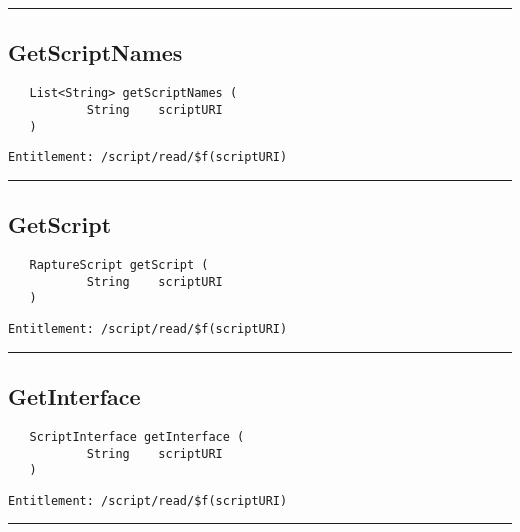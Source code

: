 \rule{12cm}{2pt}
\subsection{GetScriptNames}
\label{Api:GetScriptNames}
\begin{Verbatim}
   List<String> getScriptNames (
           String    scriptURI
   )
\end{Verbatim}
\begin{Verbatim}[formatcom=\color{Maroon}]
  Entitlement: /script/read/$f(scriptURI)
\end{Verbatim}



\rule{12cm}{2pt}
\subsection{GetScript}
\label{Api:GetScript}
\begin{Verbatim}
   RaptureScript getScript (
           String    scriptURI
   )
\end{Verbatim}
\begin{Verbatim}[formatcom=\color{Maroon}]
  Entitlement: /script/read/$f(scriptURI)
\end{Verbatim}



\rule{12cm}{2pt}
\subsection{GetInterface}
\label{Api:GetInterface}
\begin{Verbatim}
   ScriptInterface getInterface (
           String    scriptURI
   )
\end{Verbatim}
\begin{Verbatim}[formatcom=\color{Maroon}]
  Entitlement: /script/read/$f(scriptURI)
\end{Verbatim}



\rule{12cm}{2pt}
